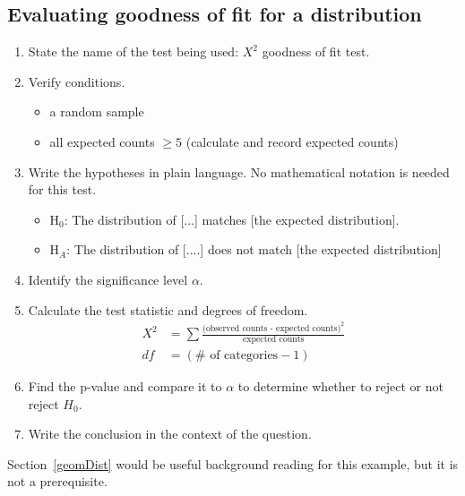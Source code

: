 \subsection{Evaluating goodness of fit for a distribution}

\begin{termBox}{
\begin{enumerate}
\setlength{\itemsep}{0mm}
\item State the name of the test being used: $X^2$ goodness of fit test.
\item Verify conditions.\vspace{-1.5mm}
\begin{itemize}
\setlength{\itemsep}{0mm}
\item a random sample
\item all expected counts $\ge 5$ (calculate and record expected counts)
\end{itemize}
\item Write the hypotheses in plain language. No mathematical notation is needed for this test.\vspace{-1.5mm}
\begin{itemize}
\setlength{\itemsep}{0mm}
\item H$_0$: The distribution of [...] matches [the expected distribution].
\item H$_A$: The distribution of [....] does not match [the expected distribution]
\end{itemize}
\item Identify the significance level $\alpha$.
\item Calculate the test statistic and degrees of freedom.\vspace{-2mm}
\begin{align*}
X^2 &= \sum{\frac{\text{(observed counts - expected counts)}^2}{\text{expected counts}}} \\
df &= (\# \text{ of categories} - 1)
\end{align*}
\item Find the p-value and compare it to $\alpha$ to determine whether to reject or not reject $H_0$.
\item Write the conclusion in the context of the question.
\end{enumerate}}
\end{termBox}

Section~\ref{geomDist} would be useful background reading for this example, but it is not a prerequisite.

